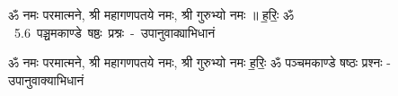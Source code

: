 \documentclass[17pt]{extarticle}
\begin{document}
\begin{titlepage}
    \begin{center}
 
\begin{sanskrit}
    { \Large
    ॐ नमः परमात्मने, श्री महागणपतये नमः, श्री गुरुभ्यो नमः ॥ ह॒रिः॒ ॐ 
    }
    \\
    \vspace{2.5cm}
    \mbox{ \Huge
    5.6      पञ्चमकाण्डे षष्ठः प्रश्नः - उपानुवाक्याभिधानं   }
\end{sanskrit}
\end{center}

\end{titlepage}
\tableofcontents

ॐ नमः परमात्मने, श्री महागणपतये नमः, श्री गुरुभ्यो नमः
ह॒रिः॒ ॐ       पञ्चमकाण्डे षष्ठः प्रश्नः - उपानुवाक्याभिधानं \newline

\end{document}
